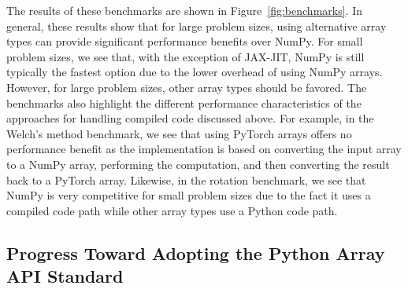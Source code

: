 \documentclass[acmsmall]{acmart}
\begin{document}
The results of these benchmarks are shown in Figure~\ref{fig:benchmarks}. In general,
these results show that for large problem sizes, using alternative array types can
provide significant performance benefits over NumPy. For small problem sizes, we see
that, with the exception of JAX-JIT, NumPy is still typically the fastest option due
to the lower overhead of using NumPy arrays. However, for large problem sizes, other
array types should be favored. The benchmarks also highlight the different performance
characteristics of the approaches for handling compiled code discussed above.
For example, in the Welch's method benchmark, we see that using PyTorch arrays offers
no performance benefit as the implementation is based on converting the input array to a
NumPy array, performing the computation, and then converting the result back to a
PyTorch array. Likewise, in the rotation benchmark, we see that NumPy is very
competitive for small problem sizes due to the fact it uses a compiled code path while
other array types use a Python code path.

\subsection{Progress Toward Adopting the Python Array API Standard}
\end{document}
